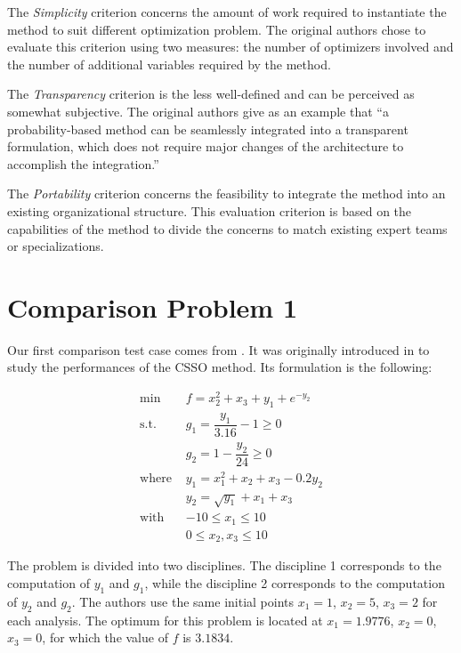 The \emph{Simplicity} criterion concerns the amount of work required to instantiate the method to suit different optimization problem. The original authors chose to evaluate this criterion using two measures: the number of optimizers involved and the number of additional variables required by the method.

The \emph{Transparency} criterion is the less well-defined and can be perceived as somewhat subjective. The original authors give as an example that \enquote{a probability-based method can be seamlessly integrated into a transparent formulation, which does not require major changes of the architecture to accomplish the integration.}

The \emph{Portability} criterion concerns the feasibility to integrate the method into an existing organizational structure. This evaluation criterion is based on the capabilities of the method to divide the concerns to match existing expert teams or specializations.

\section{Comparison Problem 1}

Our first comparison test case comes from \cite{perez2004evaluation}. It was originally introduced in \cite{sellar1996response} to study the performances of the CSSO method. Its formulation is the following:

\begin{align*}
\text{min }		&	f =x_2^2 + x_3 + y_1 + e^{-y_2}\\
\text{s.t. }			&	g_1 = \dfrac{y_1}{3.16} - 1 \geq 0\\ 
							&	g_2 = 1 - \dfrac{y_2}{24} \geq 0\\
\text{where }	&	y_1 = x_1^2 + x_2 + x_3 - 0.2y_2\\
							&	y_2 = \sqrt{y_1} + x_1 + x_3\\
\text{with }		& -10 \leq x_1 \leq 10\\
							& 0 \leq x_2, x_3 \leq 10
\end{align*}

The problem is divided into two disciplines. The discipline 1 corresponds to the computation of $y_1$ and $g_1$, while the discipline 2 corresponds to the computation of  $y_2$ and $g_2$. The authors use the same initial points $x_1 = 1$, $x_2 = 5$, $x_3 = 2$ for each analysis. The optimum for this problem is located at $x_1 = 1.9776$, $x_2 = 0$, $x_3 = 0$, for which the value of $f$ is $3.1834$.

